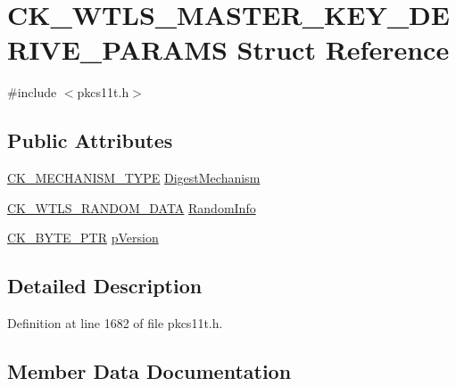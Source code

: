 \hypertarget{struct_c_k___w_t_l_s___m_a_s_t_e_r___k_e_y___d_e_r_i_v_e___p_a_r_a_m_s}{}\section{C\+K\+\_\+\+W\+T\+L\+S\+\_\+\+M\+A\+S\+T\+E\+R\+\_\+\+K\+E\+Y\+\_\+\+D\+E\+R\+I\+V\+E\+\_\+\+P\+A\+R\+A\+MS Struct Reference}
\label{struct_c_k___w_t_l_s___m_a_s_t_e_r___k_e_y___d_e_r_i_v_e___p_a_r_a_m_s}


{\ttfamily \#include $<$pkcs11t.\+h$>$}

\subsection*{Public Attributes}
\begin{DoxyCompactItemize}
\item 
\hyperlink{pkcs11t_8h_aaf1084907f5cc09a3e0b85ab022a240d}{C\+K\+\_\+\+M\+E\+C\+H\+A\+N\+I\+S\+M\+\_\+\+T\+Y\+PE} \hyperlink{struct_c_k___w_t_l_s___m_a_s_t_e_r___k_e_y___d_e_r_i_v_e___p_a_r_a_m_s_ad9f74c384a9226b0c2adea1b32fb10b2}{Digest\+Mechanism}
\item 
\hyperlink{struct_c_k___w_t_l_s___r_a_n_d_o_m___d_a_t_a}{C\+K\+\_\+\+W\+T\+L\+S\+\_\+\+R\+A\+N\+D\+O\+M\+\_\+\+D\+A\+TA} \hyperlink{struct_c_k___w_t_l_s___m_a_s_t_e_r___k_e_y___d_e_r_i_v_e___p_a_r_a_m_s_af7d855b182a5300a76fc7300c1c6ebaa}{Random\+Info}
\item 
\hyperlink{pkcs11t_8h_a3d7233a4077fbaf7ae76b64da0a62a21}{C\+K\+\_\+\+B\+Y\+T\+E\+\_\+\+P\+TR} \hyperlink{struct_c_k___w_t_l_s___m_a_s_t_e_r___k_e_y___d_e_r_i_v_e___p_a_r_a_m_s_ac90dc51250d0ccbe76a8dde765d1e1cf}{p\+Version}
\end{DoxyCompactItemize}


\subsection{Detailed Description}


Definition at line 1682 of file pkcs11t.\+h.



\subsection{Member Data Documentation}
\mbox{\label{struct_c_k___w_t_l_s___m_a_s_t_e_r___k_e_y___d_e_r_i_v_e___p_a_r_a_m_s_ad9f74c384a9226b0c2adea1b32fb10b2}} 
